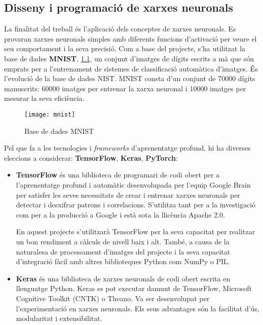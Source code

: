 \begin{refsection}

	\chapter{Disseny i programació de xarxes neuronals}
	\label{chap:pract}

	La finalitat del treball és l'aplicació dels conceptes de xarxes neuronals. Es provaran xarxes neuronals simples amb diferents funcions d'activació per veure el seu comportament i la seva precisió. Com a base del projecte, s'ha utilitzat la base de dades \textbf{MNIST}, \cref{fig:mnist}, un conjunt d'imatges de dígits escrits a mà que són emprats per a l'entrenament de sistemes de classificació automàtica d'imatges. És l'evolució de la base de dades NIST. MNIST consta d'un conjunt de 70000 dígits manuscrits: 60000 imatges per entrenar la xarxa neuronal i 10000 imatges per mesurar la seva eficiència.\supercite{MNIST}
	
	\begin{figure}[h]
		\centering
		\texttt{[image: mnist]}
		\caption{Base de dades MNIST}
		\label{fig:mnist}
	\end{figure}

	Pel que fa a les tecnologies i \textit{frameworks} d'aprenentatge profund, hi ha diverses eleccions a considerar: \textbf{TensorFlow}, \textbf{Keras}, \textbf{PyTorch}:
	
	\begin{itemize}
		\item \textbf{TensorFlow} és una biblioteca de programari de codi obert per a l'aprenentatge profund i automàtic desenvolupada per l'equip Google Brain per satisfer les seves necessitats de crear i entrenar xarxes neuronals per detectar i desxifrar patrons i correlacions. S'utilitza tant per a la investigació com per a la producció a Google i està sota la llicència Apache 2.0.\supercite{TensorFlow}
		
		En aquest projecte s'utilitzarà TensorFlow per la seva capacitat per realitzar un bon rendiment a càlculs de nivell baix i alt. També, a causa de la naturalesa de processament d'imatges del projecte i la seva capacitat d'integració fàcil amb altres biblioteques Python com NumPy\supercite{NumPy} o PIL.\supercite{Pillow}
		
		\item \textbf{Keras} és una biblioteca de xarxes neuronals de codi obert escrita en llenguatge Python. Keras es pot executar damunt de TensorFlow, Microsoft Cognitive Toolkit (CNTK) o Theano. Va ser desenvolupat per l'experimentació en xarxes neuronals. Els seus advantages són la facilitat d'ús, modularitat i extensibilitat.\supercite{Keras}
		

\end{itemize}
\end{refsection}
